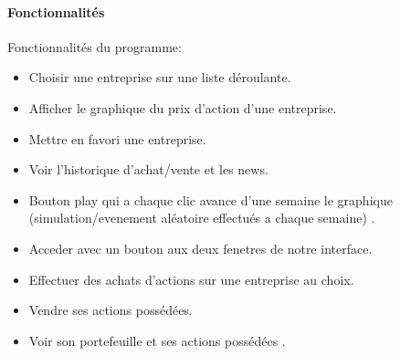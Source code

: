 \paragraph{Fonctionnalités} Fonctionnalités du programme:
\begin{itemize}
\item Choisir une entreprise sur une liste déroulante.
\item Afficher le graphique du prix d'action d'une entreprise.
\item Mettre en favori une entreprise.
\item Voir l'historique d'achat/vente et les news.
\item Bouton play qui a chaque clic avance d'une semaine le graphique (simulation/evenement aléatoire effectués a chaque semaine) .
\item Acceder avec un bouton aux deux fenetres de notre interface.
\item Effectuer des achats d'actions sur une entreprise au choix.
\item Vendre ses actions possédées.
\item Voir son portefeuille et ses actions possédées .
\end{itemize}

